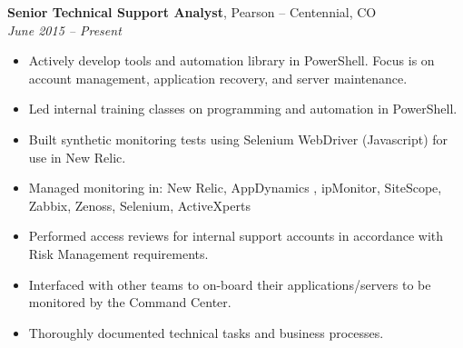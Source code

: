 {\bf Senior Technical Support Analyst}, Pearson – Centennial, CO\\
{\it June 2015 – Present}
\begin{itemize}
	\item Actively develop tools and automation library in PowerShell. Focus is on account management, application recovery, and server maintenance.
	\item Led internal training classes on programming and automation in PowerShell.
	\item Built synthetic monitoring tests using Selenium WebDriver (Javascript) for use in New Relic.
	\item Managed monitoring in: New Relic, AppDynamics , ipMonitor, SiteScope, Zabbix, Zenoss, Selenium, ActiveXperts
	\item Performed access reviews for internal support accounts in accordance with Risk Management requirements.
	\item Interfaced with other teams to on-board their applications/servers to be monitored by the Command Center.
	\item Thoroughly documented technical tasks and business processes.
\end{itemize}
